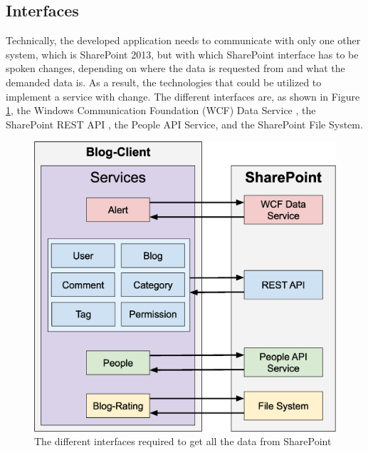 \documentclass[Bachelor,BIF,english]{twbook}
\begin{document}
\subsection{Interfaces}
Technically, the developed application needs to communicate with only one other system, which is SharePoint 2013, but with which SharePoint interface has to be spoken changes, depending on where the data is requested from and what the demanded data is. As a result, the technologies that could be utilized to implement a service with change. The different interfaces are, as shown in Figure \ref{Fig7}, the Windows Communication Foundation (WCF) Data Service \cite{SPWcf}, the SharePoint REST API \cite{SPRest}, the People API Service, and the SharePoint File System.
\\[\baselineskip]
\begin{figure}[!htbp]
\centering
\includegraphics[width=0.85\linewidth]{PICs/communication_sharepoint_services.eps}
\caption{The different interfaces required to get all the data from SharePoint}\label{Fig7}
\end{figure}
\end{document}
